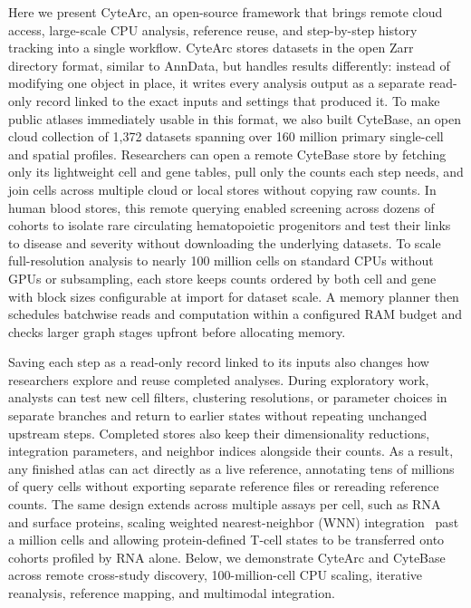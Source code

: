 \documentclass[11pt]{article}
\begin{document}
Here we present CyteArc, an open-source framework that brings remote cloud access, large-scale CPU analysis, reference reuse, and step-by-step history tracking into a single workflow. CyteArc stores datasets in the open Zarr directory format, similar to AnnData, but handles results differently: instead of modifying one object in place, it writes every analysis output as a separate read-only record linked to the exact inputs and settings that produced it. To make public atlases immediately usable in this format, we also built CyteBase, an open cloud collection of 1,372 datasets spanning over 160 million primary single-cell and spatial profiles. Researchers can open a remote CyteBase store by fetching only its lightweight cell and gene tables, pull only the counts each step needs, and join cells across multiple cloud or local stores without copying raw counts. In human blood stores, this remote querying enabled screening across dozens of cohorts to isolate rare circulating hematopoietic progenitors and test their links to disease and severity without downloading the underlying datasets. To scale full-resolution analysis to nearly 100 million cells on standard CPUs without GPUs or subsampling, each store keeps counts ordered by both cell and gene with block sizes configurable at import for dataset scale. A memory planner then schedules batchwise reads and computation within a configured RAM budget and checks larger graph stages upfront before allocating memory.

Saving each step as a read-only record linked to its inputs also changes how researchers explore and reuse completed analyses. During exploratory work, analysts can test new cell filters, clustering resolutions, or parameter choices in separate branches and return to earlier states without repeating unchanged upstream steps. Completed stores also keep their dimensionality reductions, integration parameters, and neighbor indices alongside their counts. As a result, any finished atlas can act directly as a live reference, annotating tens of millions of query cells without exporting separate reference files or rereading reference counts. The same design extends across multiple assays per cell, such as RNA and surface proteins, scaling weighted nearest-neighbor (WNN) integration~\cite{hao2021} past a million cells and allowing protein-defined T-cell states to be transferred onto cohorts profiled by RNA alone. Below, we demonstrate CyteArc and CyteBase across remote cross-study discovery, 100-million-cell CPU scaling, iterative reanalysis, reference mapping, and multimodal integration.
\end{document}
